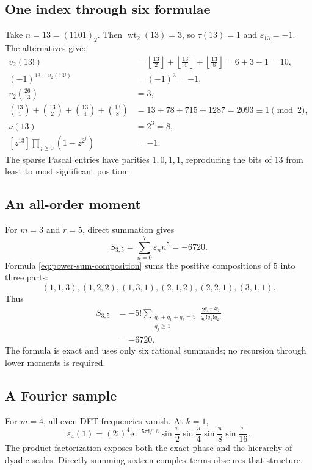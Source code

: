 \documentclass[11pt,oneside]{article}
\theoremstyle{definition}
\theoremstyle{remark}
\newcommand{\e}{\mathrm e}
\newcommand{\ii}{\mathrm i}
\newcommand{\wt}{\operatorname{wt}_2}
\newcommand{\vtwo}{v_2}
\begin{document}
\subsection{One index through six formulae}

Take \(n=13=(1101)_2\).  Then \(\wt(13)=3\), so
\(\tau(13)=1\) and \(\varepsilon_{13}=-1\).  The alternatives give:
\begin{align*}
 \vtwo(13!)&=\left\lfloor\frac{13}{2}\right\rfloor
 +\left\lfloor\frac{13}{4}\right\rfloor
 +\left\lfloor\frac{13}{8}\right\rfloor=6+3+1=10,\\
 (-1)^{13-\vtwo(13!)}&=(-1)^3=-1,\\
 \vtwo\binom{26}{13}&=3,\\
 \binom{13}{1}+\binom{13}{2}+\binom{13}{4}+\binom{13}{8}
 &=13+78+715+1287=2093\equiv1\pmod2,\\
 \nu(13)&=2^3=8,\\
 [z^{13}]\prod_{j\ge0}(1-z^{2^j})&=-1.
\end{align*}
The sparse Pascal entries have parities \(1,0,1,1\), reproducing the bits of
\(13\) from least to most significant position.

\subsection{An all-order moment}

For \(m=3\) and \(r=5\), direct summation gives
\begin{equation*}
 S_{3,5}=\sum_{n=0}^7\varepsilon_nn^5=-6720.
\end{equation*}
Formula \eqref{eq:power-sum-composition} sums the positive compositions of
\(5\) into three parts:
\begin{equation*}
 (1,1,3),(1,2,2),(1,3,1),(2,1,2),(2,2,1),(3,1,1).
\end{equation*}
Thus
\begin{align*}
 S_{3,5}
 &=-5!\sum_{\substack{q_0+q_1+q_2=5\\ q_j\ge1}}
   \frac{2^{q_1+2q_2}}{q_0!q_1!q_2!}\\
 &=-6720.
\end{align*}
The formula is exact and uses only six rational summands; no recursion through
lower moments is required.

\subsection{A Fourier sample}

For \(m=4\), all even DFT frequencies vanish.  At \(k=1\),
\begin{equation*}
 \widehat\varepsilon_4(1)
 =(2\ii)^4\e^{-15\pi\ii/16}
 \sin\frac\pi2\sin\frac\pi4\sin\frac\pi8\sin\frac\pi{16}.
\end{equation*}
The product factorization exposes both the exact phase and the hierarchy of
dyadic scales.  Directly summing sixteen complex terms obscures that
structure.
\end{document}
